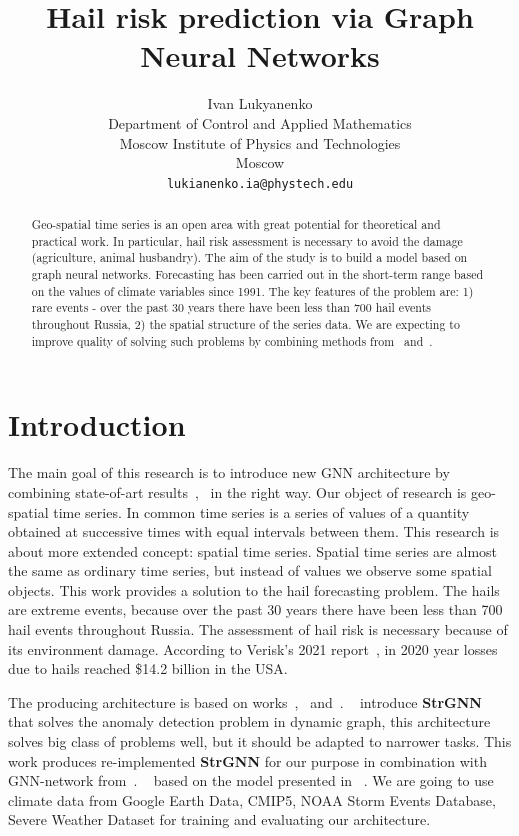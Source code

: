 \documentclass{article}
\title{Hail risk prediction via Graph Neural Networks}
\author{ Ivan Lukyanenko \\
	Department of Control and Applied Mathematics\\
	Moscow Institute of Physics and Technologies\\
	Moscow \\
	\texttt{lukianenko.ia@phystech.edu} \\
}
\date{}
\begin{document}
\fontsize{12}{14pt}\selectfont
\maketitle

\begin{abstract}
	Geo-spatial time series is an open area with great potential for theoretical and practical work. In particular, hail risk assessment is necessary to avoid the damage (agriculture, animal husbandry). The aim of the study is to build a  model based on graph neural networks. Forecasting has been carried out in the short-term range based on the values of climate variables since 1991. The key features of the problem are: 1) rare events - over the past 30 years there have been less than 700 hail events throughout Russia, 2) the spatial structure of the series data. We are expecting to improve quality of solving such problems by combining methods from~\cite{DBLP:journals/corr/abs-2012-01598} and~\cite{DBLP:journals/corr/abs-2005-07427}.
\end{abstract}



\section{Introduction}
The main goal of this research is to introduce new GNN architecture by combining state-of-art results~\cite{DBLP:journals/corr/abs-2012-01598},~\cite{DBLP:journals/corr/abs-2005-07427} in the right way. Our object of research is geo-spatial time series. In common time series is a series of values of a quantity obtained at successive times with equal intervals between them. This research is about more extended concept: spatial time series. Spatial time series are almost the same as ordinary time series, but instead of values we observe some spatial objects. This work provides a solution to the hail forecasting problem. The hails are extreme events, because over the past 30 years there have been less than 700 hail events throughout Russia. The assessment of hail risk is necessary because of its environment damage. According to Verisk’s 2021 report~\cite{haillosses}, in 2020 year losses due to hails reached \$14.2 billion in the USA.

The producing architecture is based on works~\cite{DBLP:journals/corr/abs-2012-01598},~\cite{wu2020connecting} and~\cite{DBLP:journals/corr/abs-2005-07427}. ~\cite{DBLP:journals/corr/abs-2005-07427} introduce \textbf{StrGNN} that solves the anomaly detection problem in dynamic graph, this architecture solves big class of problems well, but it should be adapted to narrower tasks. This work produces re-implemented \textbf{StrGNN} for our purpose in combination with GNN-network from~\cite{DBLP:journals/corr/abs-2012-01598}. ~\cite{DBLP:journals/corr/abs-2012-01598} based on the model presented in ~\cite{wu2020connecting}. We are going to use climate data from Google Earth Data, CMIP5, NOAA Storm Events Database, Severe Weather Dataset for training and evaluating our architecture.
\end{document}
